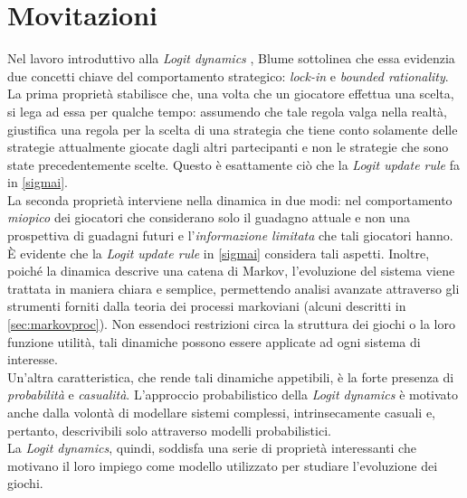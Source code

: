 \section{Movitazioni}
Nel lavoro introduttivo alla \textit{Logit dynamics} \cite{blume1993statistical}, Blume sottolinea che essa evidenzia due concetti chiave del comportamento strategico: \textit{lock-in} e \textit{bounded rationality}.\\
La prima proprietà stabilisce che, una volta che un giocatore effettua una scelta, si lega ad essa per qualche tempo: assumendo che tale regola valga nella realtà, giustifica una regola per la scelta di una strategia che tiene conto solamente delle strategie attualmente giocate dagli altri partecipanti e non le strategie che sono state precedentemente scelte. Questo è esattamente ciò che la \textit{Logit update rule} fa in \ref{sigmai}.\\
La seconda proprietà interviene nella dinamica in due modi: nel comportamento \textit{miopico} dei giocatori che considerano solo il guadagno attuale e non una prospettiva di guadagni futuri e l'\textit{informazione limitata} che tali giocatori hanno. È evidente che la \textit{Logit update rule} in \ref{sigmai} considera tali aspetti. Inoltre, poiché la dinamica descrive una catena di Markov, l'evoluzione del sistema viene trattata in maniera chiara e semplice, permettendo analisi avanzate attraverso gli strumenti forniti dalla teoria dei processi markoviani (alcuni descritti in \ref{sec:markovproc}). Non essendoci restrizioni circa la struttura dei giochi o la loro funzione utilità, tali dinamiche possono essere applicate ad ogni sistema di interesse.\\
Un'altra caratteristica, che rende tali dinamiche appetibili, è la forte presenza di \textit{probabilità} e \textit{casualità}. L'approccio probabilistico della \textit{Logit dynamics} è motivato anche dalla volontà di modellare sistemi complessi, intrinsecamente casuali e, pertanto, descrivibili solo attraverso modelli probabilistici.\\
La \textit{Logit dynamics}, quindi, soddisfa una serie di proprietà interessanti che motivano il loro impiego come modello utilizzato per studiare l'evoluzione dei giochi.
